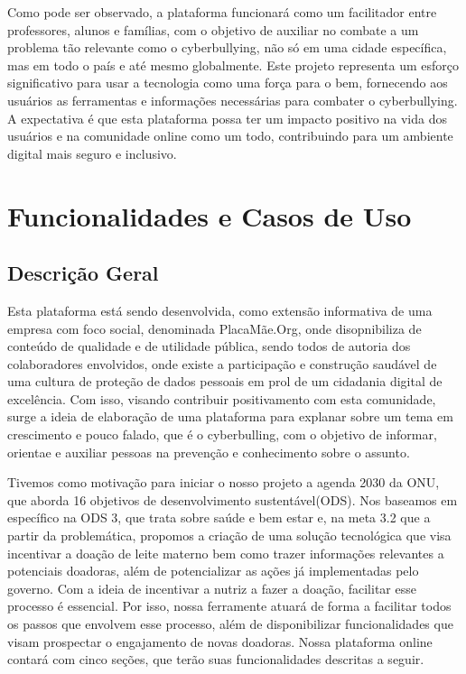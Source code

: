 Como pode ser observado, a plataforma funcionará como um facilitador entre professores, alunos e famílias, com o objetivo de auxiliar no combate a um problema tão relevante como o cyberbullying, não só em uma cidade específica, mas em todo o país e até mesmo globalmente. Este projeto representa um esforço significativo para usar a tecnologia como uma força para o bem, fornecendo aos usuários as ferramentas e informações necessárias para combater o cyberbullying. A expectativa é que esta plataforma possa ter um impacto positivo na vida dos usuários e na comunidade online como um todo, contribuindo para um ambiente digital mais seguro e inclusivo.


\chapter{Funcionalidades e Casos de Uso}
\section{Descrição Geral}
\label{sec:descricao}
Esta plataforma está sendo desenvolvida, como extensão informativa de uma empresa com foco social, denominada PlacaMãe.Org, onde disopnibiliza de conteúdo de qualidade e de utilidade pública, sendo todos de autoria dos colaboradores envolvidos, onde existe a participação e construção saudável de uma cultura de proteção de dados pessoais em prol de um cidadania digital de excelência.
Com isso, visando contribuir positivamento com esta comunidade, surge a ideia de elaboração de uma plataforma para explanar sobre um tema em crescimento e pouco falado, que é o cyberbulling, com o objetivo de informar, orientae e auxiliar pessoas na prevenção e conhecimento sobre o assunto.


Tivemos como motivação para iniciar o nosso projeto a agenda 2030 da ONU, que aborda 16 objetivos de desenvolvimento sustentável(ODS). Nos baseamos em específico na ODS 3, que trata sobre saúde e bem estar e, na meta 3.2 que
a partir da problemática, propomos a criação de uma solução tecnológica que visa incentivar a doação de leite materno bem como trazer informações relevantes a potenciais doadoras, além de potencializar as ações já implementadas pelo governo.
Com a ideia de incentivar a nutriz a fazer a doação, facilitar esse processo é essencial. Por isso, nossa ferramente atuará de forma a facilitar todos os passos que envolvem esse processo, além de disponibilizar funcionalidades que visam prospectar o engajamento de novas doadoras. 
Nossa plataforma online contará com cinco seções, que terão suas funcionalidades descritas a seguir. 

